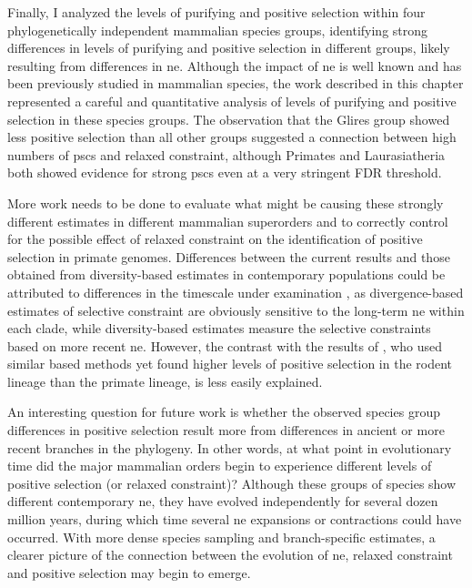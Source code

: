 Finally, I analyzed the levels of purifying and positive selection
within four phylogenetically independent mammalian species groups,
identifying strong differences in levels of purifying and positive
selection in different groups, likely resulting from differences in
\ac{ne}. Although the impact of \ac{ne} is well known and has been
previously studied in mammalian species, the work described in this
chapter represented a careful and quantitative analysis of levels of
purifying and positive selection in these species groups. The
observation that the Glires group showed less positive selection than
all other groups suggested a connection between high numbers of
\acp{psc} and relaxed constraint, although Primates and Laurasiatheria
both showed evidence for strong \acp{psc} even at a very stringent FDR
threshold.

More work needs to be done to evaluate what might be causing these
strongly different estimates in different mammalian superorders and to
correctly control for the possible effect of relaxed constraint on the
identification of positive selection in primate genomes. Differences
between the current results and those obtained from diversity-based
estimates in contemporary populations could be attributed to
differences in the timescale under examination \citep{Ellegren2009},
as divergence-based estimates of selective constraint are obviously
sensitive to the long-term \ac{ne} within each clade, while
diversity-based estimates measure the selective constraints based on
more recent \ac{ne}. However, the contrast with the results of
\citet{Kosiol2008}, who used similar \dnds based methods yet found
higher levels of positive selection in the rodent lineage than the
primate lineage, is less easily explained.

An interesting question for future work is whether the observed
species group differences in positive selection result more from
differences in ancient or more recent branches in the phylogeny. In
other words, at what point in evolutionary time did the major
mammalian orders begin to experience different levels of positive
selection (or relaxed constraint)? Although these groups of species
show different contemporary \ac{ne}, they have evolved independently
for several dozen million years, during which time several \ac{ne}
expansions or contractions could have occurred. With more dense
species sampling and branch-specific \dnds estimates, a clearer
picture of the connection between the evolution of \ac{ne}, relaxed
constraint and positive selection may begin to emerge.

